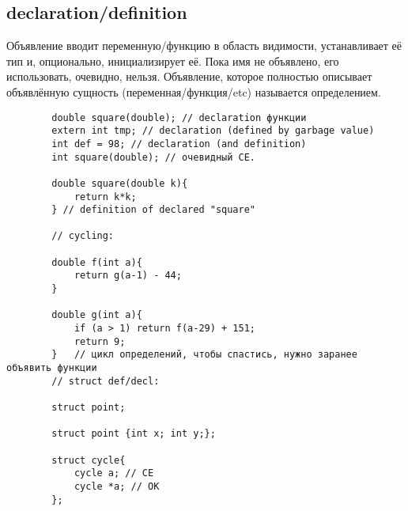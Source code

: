 \documentclass[15pt, a4paper]{article}
\begin{document}
    \subsection{declaration/definition}
    Объявление вводит переменную/функцию в область видимости, устанавливает её тип и, опционально, инициализирует её.
    Пока имя не объявлено, его использовать, очевидно, нельзя. Объявление, которое полностью описывает объявлённую сущность (переменная/функция/etc) называется определением.
    \begin{verbatim}
        double square(double); // declaration функции
        extern int tmp; // declaration (defined by garbage value)
        int def = 98; // declaration (and definition)
        int square(double); // очевидный CE.
        
        double square(double k){
            return k*k;
        } // definition of declared "square"

        // cycling:

        double f(int a){
            return g(a-1) - 44;
        }

        double g(int a){
            if (a > 1) return f(a-29) + 151;
            return 9;
        }   // цикл определений, чтобы спастись, нужно заранее объявить функции
        // struct def/decl:

        struct point;

        struct point {int x; int y;};

        struct cycle{
            cycle a; // CE
            cycle *a; // OK
        };
    \end{verbatim}
\end{document}

